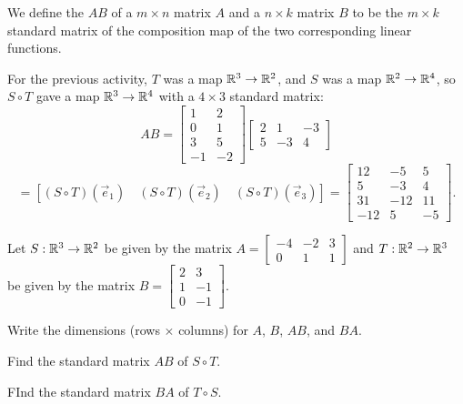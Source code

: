 \begin{definition}
We define the  \(AB\) of a \(m \times n\) matrix \(A\) and a
\(n \times k\)
matrix \(B\) to be the \(m \times k\) standard matrix of the composition map of the
two corresponding linear functions.

\vspace{1em}

For the previous activity, 
\(T\) was a map \(\mathbb{R}^3 \rightarrow \mathbb{R}^2\), and 
\(S\) was a map \(\mathbb{R}^2 \rightarrow \mathbb{R}^4\), so \(S \circ T\) gave a map \(\mathbb{R}^3 \rightarrow \mathbb{R}^4\) with a
\(4\times 3\) standard matrix:
\[
  AB
    =
  \begin{bmatrix} 1 & 2 \\ 0 & 1 \\ 3 & 5 \\ -1 & -2 \end{bmatrix}
  \begin{bmatrix} 2 & 1 & -3 \\ 5 & -3 & 4 \end{bmatrix}
\]
\[
    =
  \left[
  (S \circ T)(\vec{e}_1) \hspace{1em}
  (S\circ T)(\vec{e}_2) \hspace{1em}
  (S \circ T)(\vec{e}_3)
  \right]
    =
  \begin{bmatrix}
    12 & -5 & 5 \\
    5 & -3 & 4 \\
    31 & -12 & 11 \\
    -12 & 5 & -5
  \end{bmatrix}
.\]
\end{definition}



\begin{activity}{15}
Let \(S: \mathbb{R}^3 \rightarrow \mathbb{R}^2\) be given by the matrix 
\(A=\begin{bmatrix} -4 & -2 & 3 \\ 0 & 1 & 1 \end{bmatrix}\)
and \(T: \mathbb{R}^2 \rightarrow \mathbb{R}^3\) be given by the matrix
\(B=\begin{bmatrix} 2 & 3 \\ 1 & -1 \\ 0 & -1 \end{bmatrix}\).

\begin{subactivity}
Write the dimensions (rows \(\times\) columns)
for \(A\), \(B\), \(AB\), and \(BA\).
\end{subactivity}
\begin{subactivity}
Find the standard matrix \(AB\) of \(S \circ T\).
\end{subactivity}
\begin{subactivity}
FInd the standard matrix \(BA\) of \(T \circ S\).
\end{subactivity}
\end{activity}


